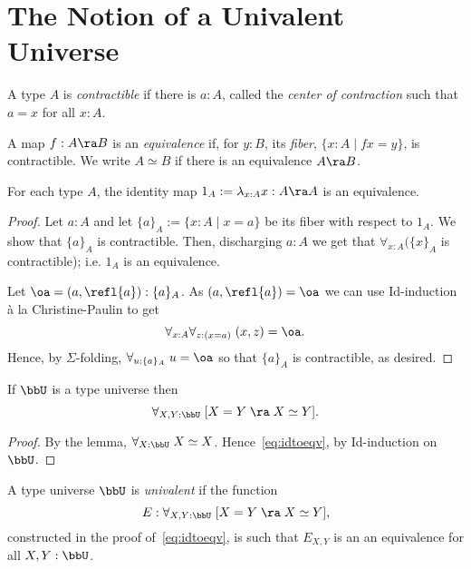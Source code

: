 \section{The Notion of a Univalent Universe}
\begin{defn} A type $A$ is {\em contractible} if there is $a:A$, called the {\em center of contraction} such that $a=x$ for all $x:A$.
\end{defn}
\begin{defn} A map $f:A\ra B$ is an {\em equivalence}
if, for $y:B$, its {\em fiber}, $\{x:A\mid fx = y\}$, is contractible.
We write $A\simeq B$ if  there is an equivalence $A\ra B$.
\end{defn}

\begin{lem}\label{lem:2.3}  For each type $A$, the identity map 
$1_A:= \lambda_{x:A}x :A\ra A$ is an equivalence.
\end{lem}
\begin{proof}  Let $a:A$ and let $\{ a\}_A:= \{ x:A\mid x=a\}$ be its fiber with respect to $1_A$.  We show that $\{ a\}_A$ is contractible.  Then, discharging $a:A$ we get that $\forall_{x:A}(\{ x\}_A$ is contractible); i.e. $1_A$ is an equivalence.

Let $\oa =(a,\refl{a}):\{ a\}_A$.  As $(a,\refl{a}) = \oa$ we can use Id-induction \`{a} la Christine-Paulin to get
  \[\forall_{x:A}\forall_{z:(x=a)}\; (x,z)=\oa.\]
Hence, by $\Sigma$-folding, $\forall_{u:\{ a\}_A}\; u=\oa$ so that $\{ a\}_A$ is contractible, as desired.
\end{proof}

\begin{cor}\label{ua:idtoeqv}
If $\bbU$ is a type universe then
\begin{equation}\label{eq:idtoeqv}
  \forall_{X,Y:\bbU}\; [X=Y\;\ra\; X\simeq Y].
\end{equation}
\end{cor}
\begin{proof}
By the lemma, $\forall_{X:\bbU}\; X\simeq X$.  Hence~\eqref{eq:idtoeqv}, by Id-induction on $\bbU$.
\end{proof}

\begin{defn}
A type universe $\bbU$ is {\em univalent} if the function
  \[ E:\forall_{X,Y:\bbU}\; [X=Y\;\ra\; X\simeq Y],\] 
constructed in the proof of~\eqref{eq:idtoeqv}, is such that $E_{X,Y}$ is an an equivalence for all $X,Y:\bbU$.
\end{defn}


